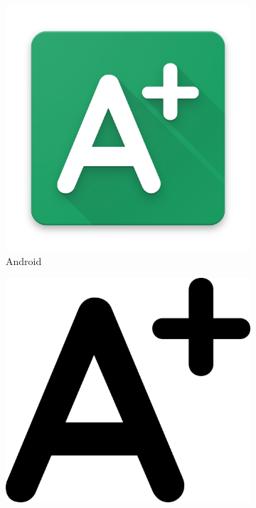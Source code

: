 \vfill
\begin{figure}[ht!]
    \begin{subfigure}[b]{0.2\textwidth-0.1cm}
        \centering
        \includegraphics[width=\columnwidth]{media/logo-gradecalc.png}
        \caption{Android}
    \end{subfigure}
    \hfill
    \begin{subfigure}[]{0.175\textwidth-0.1cm}
        \centering
        \vspace*{-35mm}
        \includegraphics[width=\columnwidth]{media/logo-gradecalc-a.png}

\end{subfigure}
\end{figure}

